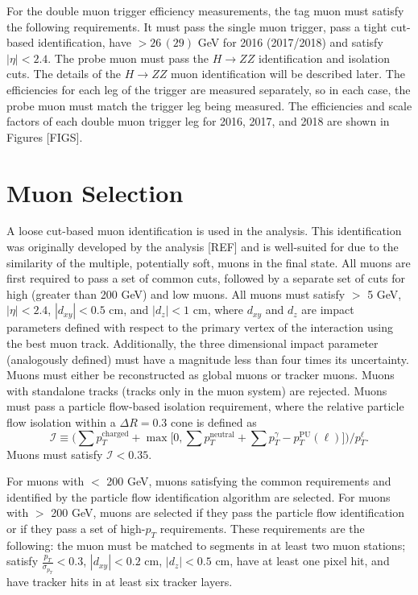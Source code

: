 For the double muon trigger efficiency measurements, the tag muon must satisfy the following requirements. It must pass the single 
muon trigger, pass a tight cut-based identification, have \pT $> 26 \, (29)$ GeV for 2016 (2017/2018) and satisfy $|\eta| < 2.4$. The 
probe muon must pass the $H \rightarrow ZZ$ identification and isolation cuts. The details of the $H \rightarrow ZZ$ muon 
identification will be described later. The efficiencies for each leg of the trigger are measured separately, so in each case, the probe 
muon must match the trigger leg being measured. The efficiencies and scale factors of each double muon trigger leg for 2016, 2017, 
and 2018 are shown in Figures [FIGS]. 

\section{Muon Selection}
A loose cut-based muon identification is used in the analysis. This identification was originally developed by the \hzz 
analysis [REF] and is well-suited for \hzg due to the similarity of the multiple, potentially soft, muons in the final state. 
All muons are first required to pass a set of common cuts, followed by a separate set of cuts for high \pT (greater than 200 GeV) 
and low \pT muons. All muons must satisfy \pT $>$ 5 GeV, $|\eta| < 2.4$, $|d_{xy}| < 0.5$ cm, and $|d_{z}| < 1$ cm, where $d_{xy}$ and 
$d_{z}$ are impact parameters defined with respect to the primary vertex of the interaction using the best muon track. 
Additionally, the three dimensional impact parameter (analogously defined) must have a magnitude less than four times its uncertainty.
Muons must either be reconstructed as global muons or tracker muons. Muons with standalone tracks (tracks only in the muon system) are
rejected. Muons must pass a particle flow-based isolation requirement, where the relative particle flow isolation 
within a $\Delta R = 0.3$ cone is defined as 
\begin{equation}
\label{eqn:pfiso}
	\mathcal{I} \equiv \Big( \sum p_{T}^\text{charged} + \max\big[ 0, \sum p_{T}^\text{neutral} +\sum p_{T}^{\gamma} - p_{T}^\mathrm{PU}(\ell) \big] \Big) / p_{T}^{\ell}.
\end{equation}
Muons must satisfy $\mathcal{I} < 0.35$. 

For muons with \pT $<$ 200 GeV, muons satisfying the common requirements and identified by the particle flow identification
algorithm are selected. For muons with \pT $>$ 200 GeV, muons are selected if they pass the particle flow identification or if they pass
a set of high-$p_{T}$ requirements. These requirements are the following: the muon must be matched to segments in at least two muon 
stations; satisfy $\frac{p_{T}}{\sigma_{p_{T}}} < 0.3$, $|d_{xy}| < 0.2$ cm, $|d_{z}| < 0.5$ cm, have at least one pixel hit, and have 
tracker hits in at least six tracker layers.

